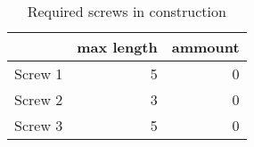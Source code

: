 \begin{table}[h!]
\centering
\caption{Required screws in construction}
\begin{tabular}{lrr}
\toprule
{} &  max length &  ammount \\
\midrule
Screw 1 &           5 &        0 \\
Screw 2 &           3 &        0 \\
Screw 3 &           5 &        0 \\
\bottomrule
\end{tabular}
\end{table}
